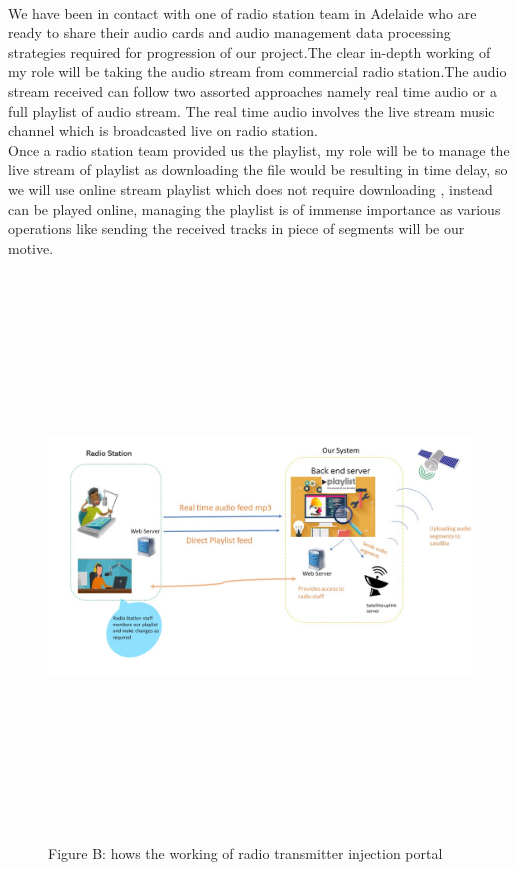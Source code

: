 \\
We have been in contact with one of radio station team in Adelaide who are ready to share their audio cards and audio management data processing strategies required for progression of our project.The clear in-depth working of my role will be taking the audio stream from commercial radio station.The audio stream received can follow two assorted approaches namely real time audio or a full playlist of audio stream. The real time audio involves the live stream music channel which is broadcasted live on radio station.\\

Once a radio station team provided us the playlist, my role will be to manage the  live stream of playlist as downloading the file would be resulting in time delay, so we will use online stream playlist which does not require downloading , instead can be played online, managing the  playlist is of immense importance as various operations like sending the received tracks in piece of segments  will be our motive.\\
\begin{figure}
\begin{centering}
\includegraphics[width=15cm,height=15cm,keepaspectratio]{Figures/1.jpg}
\caption{Figure B: hows the working of radio transmitter injection portal}
\label{radio-transmitter-injection-portal}
\end{centering}
\end{figure}
\\


